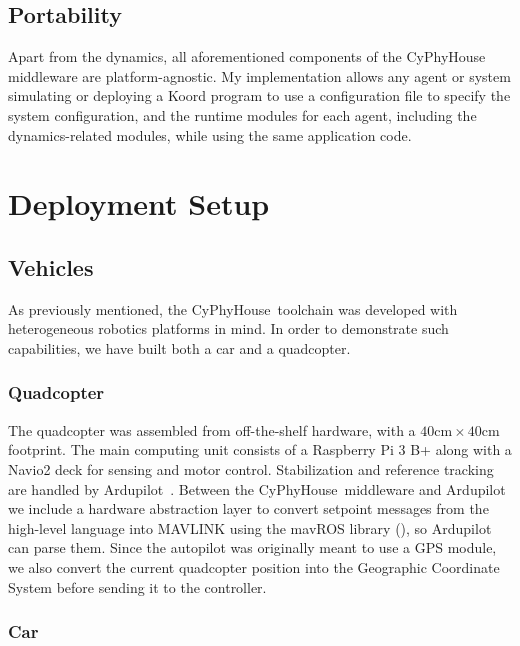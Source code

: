 \subsection{Portability}

Apart from the dynamics, all aforementioned components of the CyPhyHouse middleware are platform-agnostic.
My implementation allows any agent or system simulating or deploying a Koord program to use a configuration file to specify the system configuration, and the runtime modules for each agent, including the dynamics-related modules, while using the same application code.

\section{Deployment Setup}
\label{sec:hardware}
\subsection{Vehicles}

As previously mentioned, the CyPhyHouse\ toolchain was developed with heterogeneous robotics platforms in mind.
In order to demonstrate such capabilities, we have built both a car and a quadcopter.



\subsubsection*{Quadcopter}

The quadcopter was assembled from off-the-shelf hardware, with a $40 \text{cm} \times 40 \text{cm}$ footprint.
The main computing unit consists of a Raspberry Pi 3 B+ along with a Navio2 deck for sensing and motor control. 
Stabilization and reference tracking are handled by Ardupilot~\cite{ardupilot}.
Between the CyPhyHouse\ middleware and Ardupilot we include a hardware abstraction layer to convert setpoint messages from the high-level language into MAVLINK using the mavROS library (\cite{mavros}), so Ardupilot can parse them.
Since the autopilot was originally meant to use a GPS module, we also convert the current quadcopter position into the Geographic Coordinate System before sending it to the controller.


\subsubsection*{Car}

